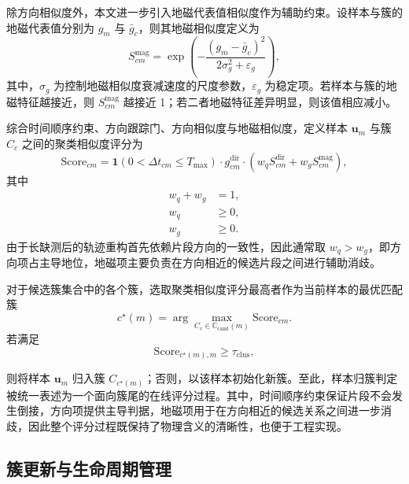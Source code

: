 \documentclass{xdupgthesis}
\begin{document}
除方向相似度外，本文进一步引入地磁代表值相似度作为辅助约束。设样本与簇的地磁代表值分别为 $g_m$ 与 $\bar{g}_c$，则其地磁相似度定义为
\begin{equation}
	S_{cm}^{\mathrm{mag}}=
	\exp
	\left(
	-\frac{(g_m-\bar{g}_c)^2}{2\sigma_g^2+\varepsilon_g}
	\right),
\end{equation}
其中，$\sigma_g$ 为控制地磁相似度衰减速度的尺度参数，$\varepsilon_g$ 为稳定项。若样本与簇的地磁特征越接近，则 $S_{cm}^{\mathrm{mag}}$ 越接近 1；若二者地磁特征差异明显，则该值相应减小。

综合时间顺序约束、方向跟踪门、方向相似度与地磁相似度，定义样本 $\mathbf{u}_m$ 与簇 $C_c$ 之间的聚类相似度评分为
\begin{equation}
	\mathrm{Score}_{cm}=
	\mathbf{1}
	\left(
	0<\Delta t_{cm}\le T_{\max}
	\right)
	\cdot
	g_{cm}^{\mathrm{dir}}
	\cdot
	\left(
	w_q S_{cm}^{\mathrm{dir}}+w_g S_{cm}^{\mathrm{mag}}
	\right),
\end{equation}
其中
\begin{equation}
	\begin{aligned}
		w_q+w_g&=1,\\
		w_q&\ge 0,\\
		w_g&\ge 0.
	\end{aligned}
\end{equation}
由于长缺测后的轨迹重构首先依赖片段方向的一致性，因此通常取 $w_q>w_g$，即方向项占主导地位，地磁项主要负责在方向相近的候选片段之间进行辅助消歧。

对于候选簇集合中的各个簇，选取聚类相似度评分最高者作为当前样本的最优匹配簇
\begin{equation}
	c^{\star}(m)=
	\arg\max_{C_c\in\mathbb{C}_{\mathrm{cand}}(m)}\mathrm{Score}_{cm}.
\end{equation}
若满足
\begin{equation}
	\mathrm{Score}_{c^{\star}(m),m}\ge \tau_{\mathrm{clus}},
\end{equation}

则将样本 $\mathbf{u}_m$ 归入簇 $C_{c^{\star}(m)}$；否则，以该样本初始化新簇。至此，样本归簇判定被统一表述为一个面向簇尾的在线评分过程。其中，时间顺序约束保证片段不会发生倒接，方向项提供主导判据，地磁项用于在方向相近的候选关系之间进一步消歧，因此整个评分过程既保持了物理含义的清晰性，也便于工程实现。



\subsection{簇更新与生命周期管理}
\end{document}
